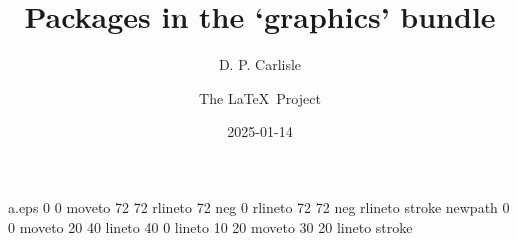 
\begin{filecontents*}{a.eps}
0 0 moveto
72 72 rlineto
72 neg 0 rlineto
72 72 neg rlineto
stroke
newpath
0 0 moveto
20 40 lineto
40 0 lineto
10 20 moveto
30 20 lineto
stroke
\end{filecontents*}
\documentclass{ltxguide}

\usepackage{color,graphicx,shortvrb}



\renewcommand\star{{\ttfamily*}}

\let\package\textsf

\newlength{\gxlen}
\settowidth{\gxlen}{\package{graphicx}: }
\newcommand\gs{\makebox[\gxlen][l]{\package{graphics}:}}
\newcommand\gx{\makebox[\gxlen][l]{\package{graphicx}:}}

\MakeShortVerb{\|}


\title{Packages in the `graphics' bundle}
\author{D. P. Carlisle \and The \LaTeX\ Project}

\date{2025-01-14}

\maketitle

\tableofcontents

\section{Introduction}
This document serves as a user-manual for the packages \package{color},
\package{graphics}, and \package{graphicx}. Further documentation may be
obtained by processing the  source (|dtx|) files of the individual
packages.

